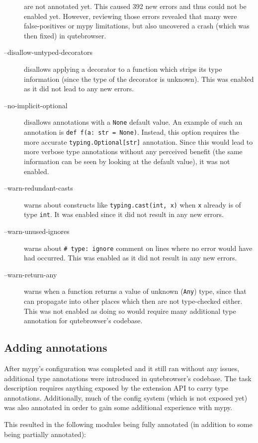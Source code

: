 \documentclass[a4paper,parskip=full,DIV=14,BCOR=15mm]{scrreprt}
\newcommand{\py}[1]{\texttt{#1}}
\begin{document}
\begin{description}
    are not annotated yet. This caused 392 new errors and thus could not be
    enabled yet. However, reviewing those errors revealed that many were
    false-positives or mypy limitations, but also uncovered a crash (which was
    then fixed) in qutebrowser.
  \item[--disallow-untyped-decorators] disallows applying a decorator to a
    function which strips its type information (since the type of the decorator
    is unknown). This was enabled as it did not lead to any new errors.
  \item[--no-implicit-optional] disallows annotations with a \py{None} default
    value. An example of such an annotation is \py{def f(a: str = None)}.
    Instead, this option requires the more accurate \py{typing.Optional[str]}
    annotation. Since this would lead to more verbose type annotations without any
    perceived benefit (the same information can be seen by looking at the default
    value), it was not enabled.
  \item[--warn-redundant-casts] warns about constructs like \py{typing.cast(int,
      x)} when \py{x} already is of type \py{int}. It was enabled since it
    did not result in any new errors.
  \item[--warn-unused-ignores] warns about \texttt{# type: ignore}
    comment on lines where no error would have had occurred. This was enabled as
    it did not result in any new errors.
  \item[--warn-return-any] warns when a function returns a value of unknown
    (\verb|Any|) type, since that can propagate into other places which then are
    not type-checked either. This was not enabled as doing so would require many
    additional type annotation for qutebrowser's codebase.
\end{description}

\subsection{Adding annotations}

After mypy's configuration was completed and it still ran without any issues,
additional type annotations were introduced in qutebrowser's codebase. The task
description requires anything exposed by the extension API to carry type
annotations. Additionally, much of the config system (which is not exposed yet)
was also annotated in order to gain some additional experience with mypy.

This resulted in the following modules being fully annotated (in addition to
some being partially annotated):
\end{document}
